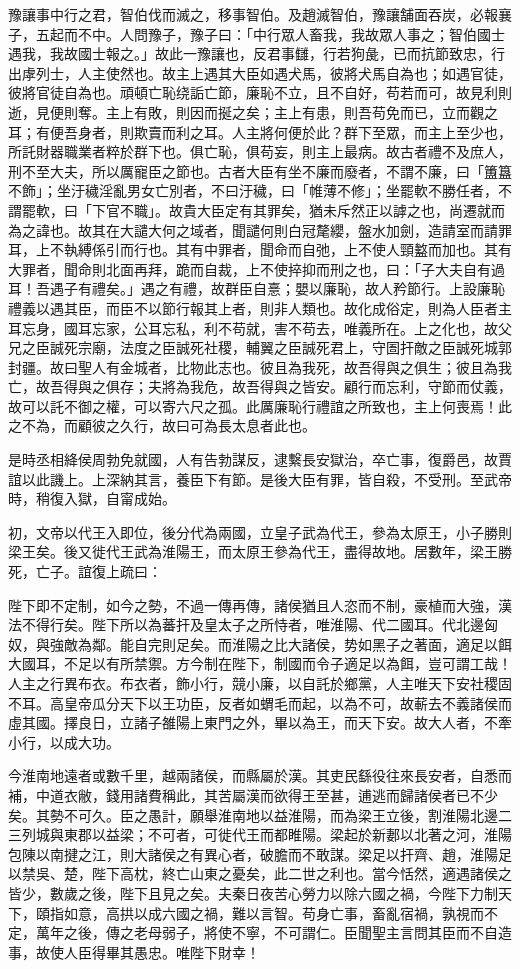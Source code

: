 \begin{pinyinscope}
豫讓事中行之君，智伯伐而滅之，移事智伯。及趙滅智伯，豫讓舗面吞炭，必報襄子，五起而不中。人問豫子，豫子曰：「中行眾人畜我，我故眾人事之；智伯國士遇我，我故國士報之。」故此一豫讓也，反君事讎，行若狗彘，已而抗節致忠，行出虖列士，人主使然也。故主上遇其大臣如遇犬馬，彼將犬馬自為也；如遇官徒，彼將官徒自為也。頑頓亡恥绕詬亡節，廉恥不立，且不自好，苟若而可，故見利則逝，見便則奪。主上有敗，則因而挻之矣；主上有患，則吾苟免而已，立而觀之耳；有便吾身者，則欺賣而利之耳。人主將何便於此？群下至眾，而主上至少也，所託財器職業者粹於群下也。俱亡恥，俱苟妄，則主上最病。故古者禮不及庶人，刑不至大夫，所以厲寵臣之節也。古者大臣有坐不廉而廢者，不謂不廉，曰「簠簋不飾」；坐汙穢淫亂男女亡別者，不曰汙穢，曰「帷薄不修」；坐罷軟不勝任者，不謂罷軟，曰「下官不職」。故貴大臣定有其罪矣，猶未斥然正以謼之也，尚遷就而為之諱也。故其在大譴大何之域者，聞譴何則白冠氂纓，盤水加劍，造請室而請罪耳，上不執縛係引而行也。其有中罪者，聞命而自弛，上不使人頸盭而加也。其有大罪者，聞命則北面再拜，跪而自裁，上不使捽抑而刑之也，曰：「子大夫自有過耳！吾遇子有禮矣。」遇之有禮，故群臣自憙；嬰以廉恥，故人矜節行。上設廉恥禮義以遇其臣，而臣不以節行報其上者，則非人類也。故化成俗定，則為人臣者主耳忘身，國耳忘家，公耳忘私，利不苟就，害不苟去，唯義所在。上之化也，故父兄之臣誠死宗廟，法度之臣誠死社稷，輔翼之臣誠死君上，守圄扞敵之臣誠死城郭封疆。故曰聖人有金城者，比物此志也。彼且為我死，故吾得與之俱生；彼且為我亡，故吾得與之俱存；夫將為我危，故吾得與之皆安。顧行而忘利，守節而仗義，故可以託不御之權，可以寄六尺之孤。此厲廉恥行禮誼之所致也，主上何喪焉！此之不為，而顧彼之久行，故曰可為長太息者此也。

是時丞相絳侯周勃免就國，人有告勃謀反，逮繫長安獄治，卒亡事，復爵邑，故賈誼以此譏上。上深納其言，養臣下有節。是後大臣有罪，皆自殺，不受刑。至武帝時，稍復入獄，自甯成始。

初，文帝以代王入即位，後分代為兩國，立皇子武為代王，參為太原王，小子勝則梁王矣。後又徙代王武為淮陽王，而太原王參為代王，盡得故地。居數年，梁王勝死，亡子。誼復上疏曰：

陛下即不定制，如今之勢，不過一傳再傳，諸侯猶且人恣而不制，豪植而大強，漢法不得行矣。陛下所以為蕃扞及皇太子之所恃者，唯淮陽、代二國耳。代北邊匈奴，與強敵為鄰。能自完則足矣。而淮陽之比大諸侯，势如黑子之著面，適足以餌大國耳，不足以有所禁禦。方今制在陛下，制國而令子適足以為餌，豈可謂工哉！人主之行異布衣。布衣者，飾小行，競小廉，以自託於鄉黨，人主唯天下安社稷固不耳。高皇帝瓜分天下以王功臣，反者如蝟毛而起，以為不可，故蔪去不義諸侯而虛其國。擇良日，立諸子雒陽上東門之外，畢以為王，而天下安。故大人者，不牽小行，以成大功。

今淮南地遠者或數千里，越兩諸侯，而縣屬於漢。其吏民繇役往來長安者，自悉而補，中道衣敝，錢用諸費稱此，其苦屬漢而欲得王至甚，逋逃而歸諸侯者已不少矣。其勢不可久。臣之愚計，願舉淮南地以益淮陽，而為梁王立後，割淮陽北邊二三列城與東郡以益梁；不可者，可徙代王而都睢陽。梁起於新郪以北著之河，淮陽包陳以南揵之江，則大諸侯之有異心者，破膽而不敢謀。梁足以扞齊、趙，淮陽足以禁吳、楚，陛下高枕，終亡山東之憂矣，此二世之利也。當今恬然，適遇諸侯之皆少，數歲之後，陛下且見之矣。夫秦日夜苦心勞力以除六國之禍，今陛下力制天下，頤指如意，高拱以成六國之禍，難以言智。苟身亡事，畜亂宿禍，孰視而不定，萬年之後，傳之老母弱子，將使不寧，不可謂仁。臣聞聖主言問其臣而不自造事，故使人臣得畢其愚忠。唯陛下財幸！


\end{pinyinscope}
